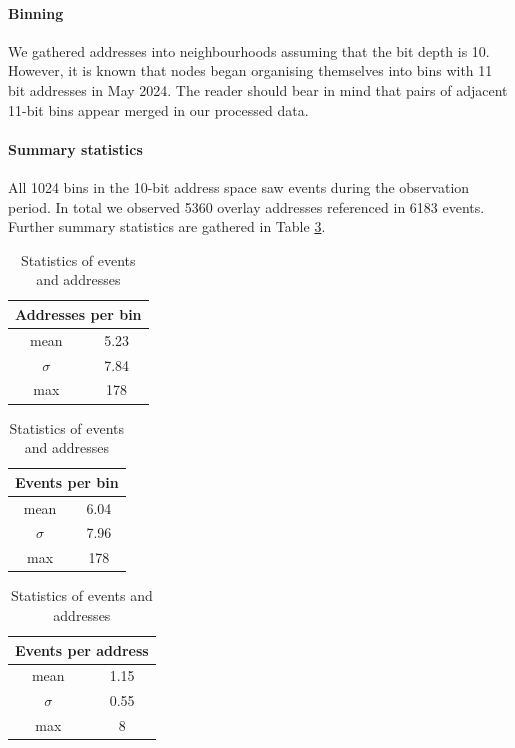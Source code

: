 \paragraph{Binning} We gathered addresses into neighbourhoods assuming that the bit depth is 10.
%
However, it is known that nodes began organising themselves into bins with 11 bit addresses in May 2024.
%
The reader should bear in mind that pairs of adjacent 11-bit bins appear merged in our processed data.

\paragraph{Summary statistics}
All 1024 bins in the 10-bit address space saw events during the observation period.
%
In total we observed 5360 overlay addresses referenced in 6183 events. 
%
Further summary statistics are gathered in Table \ref{event-statistics}.

\begin{table} 
  \begin{center}
  \begin{tabular}{cc}
    \multicolumn{2}{l}{Addresses per bin} \\
    \toprule 
    mean      & 5.23 \\
    $\sigma$  & 7.84 \\
    max       & 178 \\
    \bottomrule
  \end{tabular}
  \hspace{\tabcolsep*4}
  \begin{tabular}{cc}
    \multicolumn{2}{l}{Events per bin} \\
    \toprule 
    mean      & 6.04 \\
    $\sigma$  & 7.96 \\
    max       & 178 \\
    \bottomrule
  \end{tabular}
  \hspace{\tabcolsep*4}
  \begin{tabular}{cc}
    \multicolumn{2}{l}{Events per address}\\
    \toprule
    mean      & 1.15 \\
    $\sigma$  & 0.55 \\
    max       & 8  \\
    \bottomrule
  \end{tabular}
  \caption{
    Statistics of events and addresses
  }
  \label{event-statistics}
\end{center}
\end{table}

